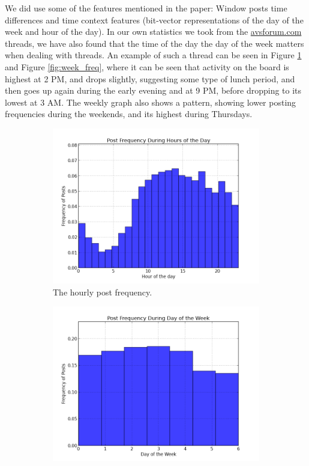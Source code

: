 We did use some of the features mentioned in the paper: Window posts time 
differences and time context features (bit-vector representations of the day of 
the week and hour of the day). In our own statistics we took from the 
\url{avsforum.com} threads, we have also found that the time of the day the day 
of the week matters when dealing with threads. An example of such a thread can 
be seen in Figure \ref{fig:hr_freq} and Figure \ref{fig:week_freq}, where it can 
be seen that activity on the board is highest at 2 PM, and drops slightly, 
suggesting some type of lunch period, and then goes up again during the early 
evening and at 9 PM, before dropping to its lowest at 3 AM. The weekly graph 
also shows a pattern, showing lower posting frequencies during the weekends, and 
its highest during Thursdays.
\begin{figure}
\begin{center}
\begin{subfigure}[b]{0.45\textwidth}
\includegraphics[width=\textwidth]{diagrams/hoursofday.png}
\caption{The hourly post frequency.}
\label{fig:hr_freq}
	\end{subfigure}
	\begin{subfigure}[b]{0.45\textwidth}
\includegraphics[width=\textwidth]{diagrams/daysofweek.png}

\end{subfigure}
\end{center}
\end{figure}
